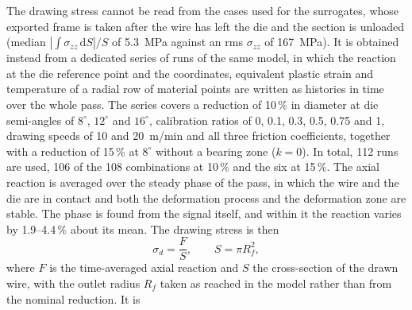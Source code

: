 \documentclass[subscriptcorrection,upint,varvw,barcolor=Goldenrod3,mathalfa=cal=euler,balance,hyphenate,french,pdf-a]{asmejour} %
\begin{document}
The drawing stress cannot be read from the cases used for the surrogates, whose exported frame is
taken after the wire has left the die and the section is unloaded (median
$|\int\sigma_{zz}\,\mathrm{d}S|/S$ of 5.3~MPa against an rms $\sigma_{zz}$ of 167~MPa).
It is obtained instead from a dedicated series of runs of the same model, in which the reaction at
the die reference point and the coordinates, equivalent plastic strain and temperature of a
radial row of material points are written as histories in time over the whole pass. The series
covers a reduction of 10\,\% in diameter at die semi-angles of $8^\circ$, $12^\circ$ and
$16^\circ$, calibration ratios of 0, 0.1, 0.3, 0.5, 0.75 and 1, drawing speeds of 10 and 20~m/min and all three friction
coefficients, together with a reduction of 15\,\% at $8^\circ$ without a bearing zone ($k = 0$). In total, 112 runs are
used, 106 of the 108 combinations at 10\,\% and the six at 15\,\%.
The axial reaction is averaged over the steady phase of the pass, in which the wire and the die
are in contact and both the deformation process and the deformation zone are stable. The phase
is found from the signal itself, and within it the reaction varies by 1.9--4.4\,\% about its
mean. The drawing stress is then
\begin{equation}
\sigma_d = \frac{F}{S}, \qquad S = \pi R_f^2,
\label{eq:sigma-d}
\end{equation}
where $F$ is the time-averaged axial reaction and $S$ the cross-section of the drawn wire, with
the outlet radius $R_f$ taken as reached in the model rather than from the nominal reduction. It is
\end{document}
